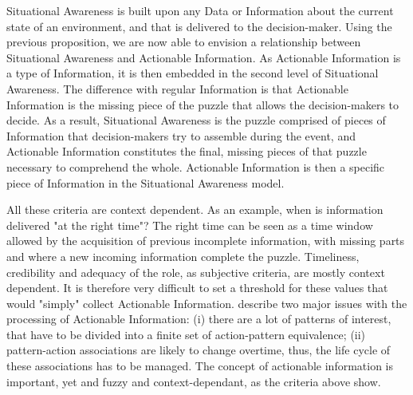 Situational Awareness is built upon any Data or Information about the current state of an environment, and that is delivered to the decision-maker.
Using the previous proposition, we are now able to envision a relationship between Situational Awareness and Actionable Information.
As Actionable Information is a type of Information, it is then embedded in the second level of Situational Awareness.
The difference with regular Information is that Actionable Information is the missing piece of the puzzle that allows the decision-makers to decide.
As a result, Situational Awareness is the puzzle comprised of pieces of Information that
decision-makers try to assemble during the event, and Actionable Information constitutes
the final, missing pieces of that puzzle necessary to comprehend the whole.
Actionable Information is then a specific piece of Information in the Situational Awareness model.

All these criteria are context dependent.
As an example, when is information delivered "at the right time"?
The right time can be seen as a time window allowed by the acquisition of previous incomplete
information, with missing parts and where a new incoming information complete the puzzle.
Timeliness, credibility and adequacy of the role, as subjective criteria, are mostly context dependent.
It is therefore very difficult to set a threshold for these values that would "simply" collect Actionable Information.
\textcite{silberschatzWhatMakesPatterns1996} describe two major issues with the processing of Actionable Information:
(i) there are a lot of patterns of interest, that have to be divided into a finite set of action-pattern equivalence;
(ii) pattern-action associations are likely to change overtime, thus, the life cycle of these associations has to be managed.
The concept of actionable information is important, yet and fuzzy and context-dependant, as the criteria above show.

